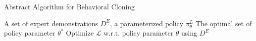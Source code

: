 \begin{algorithm}
\caption{Abstract Algorithm for Behavioral Cloning}\label{alg:bc}
\begin{algorithmic}
\Require A set of expert demonstrations $D^{E}$, a parameterized policy $\pi_{\theta}^{L}$
\Ensure The optimal set of policy parameter $\theta^{*}$
\State Optimize $\mathcal{L}$ w.r.t. policy parameter $\theta$ using $D^{E}$
\end{algorithmic}
\end{algorithm}